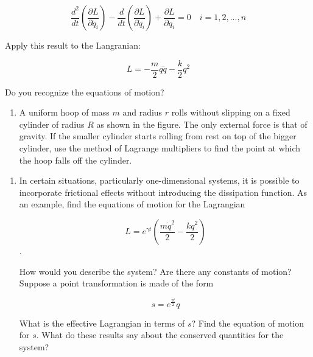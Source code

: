\documentclass{article}
\begin{document}
\begin{multicols}{2}
\begin{enumerate}[label={{\textcolor{trueblue}{\textbf{Ej}. \arabic*.0}}}, start=12]
		\[  \frac{ d^{2} }{dt} \left(  \frac{ \partial L }{ \partial \ddot{q}_{i} } \right) - \frac{d}{dt} \left(  \frac{ \partial L  }{\partial \dot{q}_{i}   }  \right) + \frac{\partial L}{\partial q_{i}} =0 \quad i = 1,2,...,n  \]
		
		Apply this result to the Langranian:
		
		\[ L = - \frac{m}{2}q\ddot{q}-\frac{k}{2}q^{2} \]
		
		Do you recognize the equations of motion?
	\end{enumerate} 
	
\begin{enumerate}[label={{\textcolor{trueblue}{\textbf{Ej}. \arabic*.0}}}, start=14]
		\item A uniform hoop of mass $m$ and radius $r$ rolls without slipping on a fixed cylinder of radius $R$ as shown in the figure. The only external force is that of gravity. If the smaller cylinder starts rolling from rest on top of the bigger cylinder, use the method of Lagrange multipliers to find the point at which the hoop falls off the cylinder.
\end{enumerate} 



\begin{enumerate}[label={{\textcolor{trueblue}{\textbf{Ej}. \arabic*.0}}}, start=16]
	\item In certain situations, particularly one-dimensional systems, it is possible to incorporate frictional effects without introducing the dissipation function. As an example, find the equations of motion for the Lagrangian
	
	\[  L = e^{\gamma{t}} \left(  \frac{ m\dot{q}^{2}  }{2} - \frac{ kq^{2}  }{ 2  }      \right)        \].
	
	How would you describe the  system? Are there any constants of motion? Suppose a point transformation is made of the form
	
	\[ s = e^{\frac{\gamma{t}}{2} }q \]
	
	What is the effective Lagrangian in terms of $s$? Find the equation of motion for $s$. What do these results say about the conserved quantities for the system?  
	
	
\end{enumerate}
	
\end{multicols} 

\newpage


\tableofcontents \newpage
\end{document}
